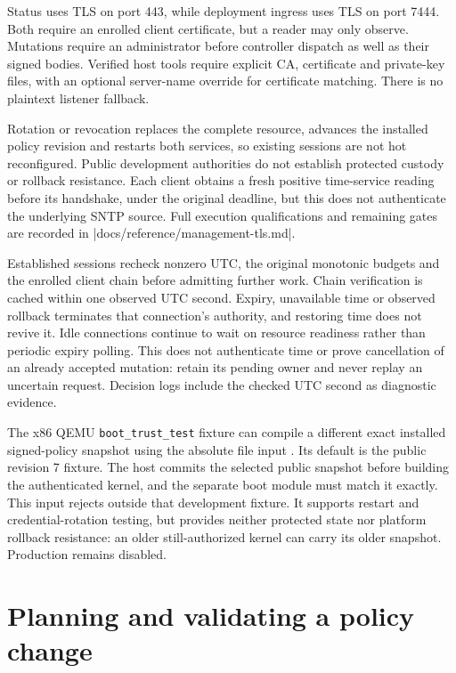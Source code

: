 Status uses TLS on port 443, while deployment ingress uses TLS on port 7444.
Both require an enrolled client certificate, but a reader may only observe.
Mutations require an administrator before controller dispatch as well as their
signed bodies. Verified host tools require explicit CA, certificate and private-key
files, with an optional server-name override for certificate matching. There is
no plaintext listener fallback.

Rotation or revocation replaces the complete resource, advances the installed
policy revision and restarts both services, so existing sessions are not hot
reconfigured. Public development authorities do not establish protected custody
or rollback resistance. Each client obtains a fresh positive time-service
reading before its handshake, under the original deadline, but this does not
authenticate the underlying SNTP source. Full execution qualifications and
remaining gates are recorded in \repofile|docs/reference/management-tls.md|.

Established sessions recheck nonzero UTC, the original monotonic budgets and
the enrolled client chain before admitting further work. Chain verification is
cached within one observed UTC second. Expiry, unavailable time or observed
rollback terminates that connection's authority, and restoring time does not revive
it. Idle connections continue to wait on resource readiness rather than periodic
expiry polling. This does not authenticate time or prove cancellation of an
already accepted mutation: retain its pending owner and never replay an uncertain
request. Decision logs include the checked UTC second as diagnostic evidence.

The x86 QEMU \texttt{boot\_trust\_test} fixture can compile a different exact
installed signed-policy snapshot using the absolute file input
. Its default is the public revision 7
fixture. The host commits the selected public snapshot before building the
authenticated kernel, and the separate boot module must match it exactly. This
input rejects outside that development fixture. It supports restart and
credential-rotation testing, but provides neither protected state nor platform
rollback resistance: an older still-authorized kernel can carry its older
snapshot. Production remains disabled.

\section{Planning and validating a policy change}

